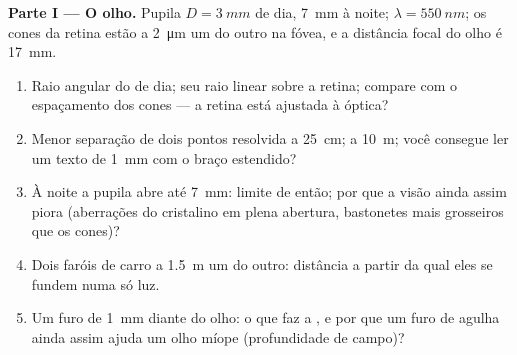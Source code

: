 \begin{problem}
\label{pb:b2:diffraction:1}

\medskip
\noindent\textbf{Parte I --- O olho.}
Pupila $D = \qty{3}{mm}$ de dia, \qty{7}{mm} à noite; $\lambda = \qty{550}{nm}$; os
cones da retina estão a \qty{2}{\micro m} um do outro na fóvea, e a distância
focal do olho é \qty{17}{mm}.
\begin{enumerate}
  \item Raio angular do  de dia; seu raio linear sobre
        a retina; compare com o espaçamento dos cones --- a retina está
        ajustada à óptica?
  \item Menor separação de dois pontos resolvida a \qty{25}{cm}; a
        \qty{10}{m}; você consegue ler um texto de \qty{1}{mm} com o braço estendido?
  \item À noite a pupila abre até \qty{7}{mm}: limite de  então;
        por que a visão ainda assim piora (aberrações do
        cristalino em plena abertura, bastonetes mais grosseiros que os cones)?
  \item Dois faróis de carro a \qty{1.5}{m} um do outro: distância a partir da qual eles se fundem
        numa só luz.
  \item Um furo de \qty{1}{mm} diante do olho: o que faz a ,
        e por que um furo de agulha ainda assim ajuda um olho míope
        (profundidade de campo)?
\end{enumerate}


\end{problem}
